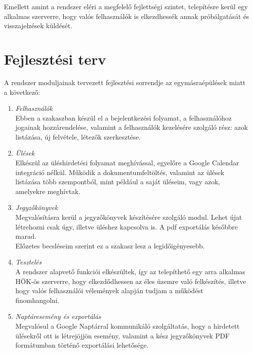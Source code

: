 \documentclass[a4paper,12pt,oneside]{report}
\begin{document}
Emellett amint a rendszer eléri a megfelelő fejlettségi szintet, telepítésre kerül egy alkalmas szerverre, hogy valós felhasználók is elkezdhessék annak próbálgatását és visszajelzések küldését.

\section{Fejlesztési terv}

A rendszer moduljainak tervezett fejlesztési sorrendje az egymásraépülések miatt a következő:

\begin{enumerate}
  \item \emph{Felhasználók}\\
    Ebben a szakaszban készül el a bejelentkezési folyamat, a felhasználóhoz jogainak hozzárendelése, valamint a felhasználók kezelésére szolgáló rész: azok listázása, új felvétele, létezők szerkesztése.
    
  \item \emph{Ülések}\\
    Elkészül az üléshirdetési folyamat meghívással, egyelőre a Google Calendar integráció nélkül. Működik a dokumentumfeltöltés, valamint az ülések listázása több szempontból, mint például a saját üléseim, vagy azok, amelyekre meghívtak.
    
  \item \emph{Jegyzőkönyvek}\\
    Megvalósításra kerül a jegyzőkönyvek készítésére szolgáló modul. Lehet újat létrehozni csak úgy, illetve üléshez kapcsolva is. A pdf exportálás későbbre marad.\\
    Előzetes becsléseim szerint ez a szakasz lesz a legidőigényesebb.
    
  \item \emph{Tesztelés}\\
    A rendszer alapvető funkciói elkészültek, így az telepíthető egy arra alkalmas HÖK-ös szerverre, hogy elkezdődhessen az éles üzemre való felkészítés, illetve hogy valós felhasználói vélemények alapján tudjam a működést finomhangolni.
    
  \item \emph{Naptáresemény és exportálás}\\
    Megvalósul a Google Naptárral kommunikáló szolgáltatás, hogy a hirdetett ülésekről ott is létrejöjjön esemény, valamint a kész jegyzőkönyvek PDF formátumban történő exportálási lehetősége.
\end{enumerate}
\end{document}
